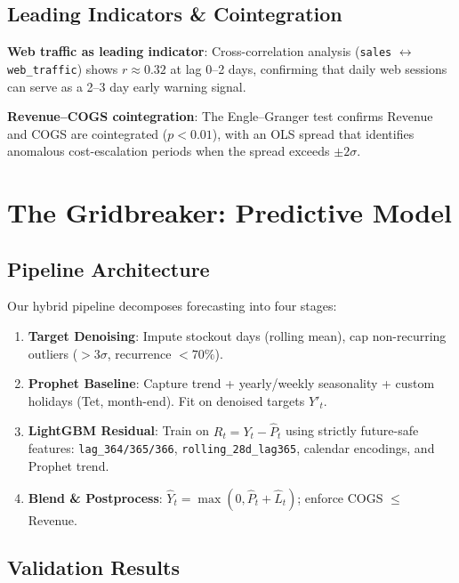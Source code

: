 \documentclass{article}
\begin{document}
\subsection{Leading Indicators \& Cointegration}

\textbf{Web traffic as leading indicator}: Cross-correlation analysis (\texttt{sales} $\leftrightarrow$ \texttt{web\_traffic}) shows $r \approx 0.32$ at lag 0--2 days, confirming that daily web sessions can serve as a 2--3 day early warning signal.

\textbf{Revenue--COGS cointegration}: The Engle--Granger test confirms Revenue and COGS are cointegrated ($p < 0.01$), with an OLS spread that identifies anomalous cost-escalation periods when the spread exceeds $\pm 2\sigma$.

\section{The Gridbreaker: Predictive Model}

\subsection{Pipeline Architecture}

Our hybrid pipeline decomposes forecasting into four stages:

\begin{enumerate}
    \item \textbf{Target Denoising}: Impute stockout days (rolling mean), cap non-recurring outliers ($>3\sigma$, recurrence $<70\%$).
    \item \textbf{Prophet Baseline}: Capture trend + yearly/weekly seasonality + custom holidays (Tet, month-end). Fit on denoised targets $Y'_t$.
    \item \textbf{LightGBM Residual}: Train on $R_t = Y_t - \hat{P}_t$ using strictly future-safe features: \texttt{lag\_364/365/366}, \texttt{rolling\_28d\_lag365}, calendar encodings, and Prophet trend.
    \item \textbf{Blend \& Postprocess}: $\hat{Y}_t = \max(0, \hat{P}_t + \hat{L}_t)$; enforce COGS $\leq$ Revenue.
\end{enumerate}

\subsection{Validation Results}
\end{document}
